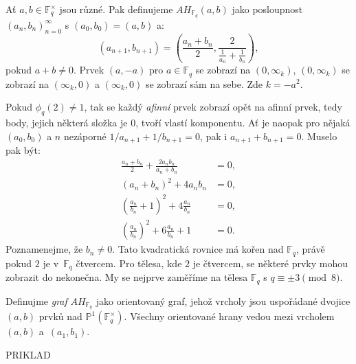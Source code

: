 \documentclass[12pt]{report}
\begin{document}
\begin{definice}
Ať $a,b \in \mathbb{F}_q ^{\times}$ jsou různé. Pak definujeme $AH_{\mathbb{F}_q}(a,b)$ jako posloupnost $(a_n,b_n)_{n=0}^{\infty}$ s $(a_0,b_0) = (a,b)$ a:
\begin{equation*}
\left(a_{n+1},b_{n+1} \right) = \left(\frac{a_n+b_n}{2}, \frac{2}{\frac{1}{a_n} + \frac{1}{b_n}} \right),
\end{equation*}
pokud $a+b \neq 0$. Prvek $(a,-a)$ pro $a \in \mathbb{F}_q$ se zobrazí na $(0,\infty_k)$, $(0,\infty_k)$ se zobrazí na $(\infty_k,0)$ a $(\infty_k,0)$ se zobrazí sám na sebe. Zde $k = -a^2$.
\end{definice}

Pokud $\phi_q(2) \neq 1$, tak se každý \textit{afinní} prvek zobrazí opět na afinní prvek, tedy body, jejich některá složka je $0$, tvoří vlastí komponentu. Ať je naopak pro nějaká $(a_0,b_0)$ a $n$ nezáporné $1/a_{n+1} + 1/b_{n+1} = 0$, pak i $a_{n+1} + b_{n+1} = 0$. Muselo pak být:
\begin{align*}
\frac{a_n+b_n}{2} + \frac{2 a_n b_n}{a_n + b_n} &= 0,\\
(a_n+b_n)^2 + 4 a_n b_n &= 0,\\
\left(\frac{a_n}{b_n} + 1 \right)^2 + 4 \frac{a_n}{b_n} &= 0,\\
\left(\frac{a_n}{b_n}\right)^2 + 6 \frac{a_n}{b_n} + 1 &= 0.
\end{align*}
Poznamenejme, že $b_n \neq 0$. Tato kvadratická rovnice má kořen nad $\mathbb{F}_q$, právě pokud $2$ je v~$\mathbb{F}_q$ čtvercem. Pro tělesa, kde $2$ je čtvercem, se některé prvky mohou zobrazit do nekonečna. My se nejprve zaměříme na tělesa $\mathbb{F}_q$ s $q \equiv \pm 3 \pmod{8}$.

\begin{definice}
Definujme \textit{graf} $AH_{\mathbb{F}_q}$ jako orientovaný graf, jehož vrcholy jsou uspořádané dvojice $(a,b)$ prvků nad $\mathbb{P}^1 (\mathbb{F}_q ^{\times})$. Všechny orientované hrany vedou mezi vrcholem $(a,b)$ a~$(a_1,b_1)$.
\end{definice}

PRIKLAD
\end{document}

